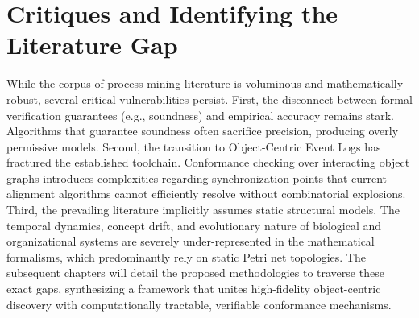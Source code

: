\section{Critiques and Identifying the Literature Gap}
While the corpus of process mining literature is voluminous and mathematically robust, several critical vulnerabilities persist.
First, the disconnect between formal verification guarantees (e.g., soundness) and empirical accuracy remains stark. Algorithms that guarantee soundness often sacrifice precision, producing overly permissive models.
Second, the transition to Object-Centric Event Logs has fractured the established toolchain. Conformance checking over interacting object graphs introduces complexities regarding synchronization points that current alignment algorithms cannot efficiently resolve without combinatorial explosions.
Third, the prevailing literature implicitly assumes static structural models. The temporal dynamics, concept drift, and evolutionary nature of biological and organizational systems are severely under-represented in the mathematical formalisms, which predominantly rely on static Petri net topologies.
The subsequent chapters will detail the proposed methodologies to traverse these exact gaps, synthesizing a framework that unites high-fidelity object-centric discovery with computationally tractable, verifiable conformance mechanisms.

